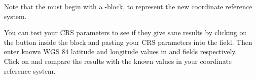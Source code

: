 Note that the  must begin with a -block,
to represent the new coordinate reference system.

You can test your CRS parameters to see if they give sane results by
clicking on the  button inside the  block 
and pasting your CRS parameters into
the  field. Then enter known WGS 84 latitude and longitude
values in  and  fields respectively. 
Click on  and compare the results with the known values in
your coordinate reference system. 
